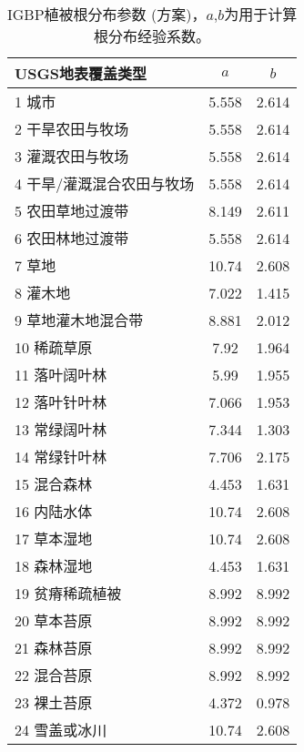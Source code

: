 \begin{table}[]
\centering
\caption{IGBP植被根分布参数 (\citet{zeng2001global}方案)，$a$,$b$为用于计算根分布经验系数。}
\label{tab:IGBP植被根分布参数}
\begin{tabular}{@{}lcc@{}}
\toprule
USGS地表覆盖类型     & $a$ & $b$ \\ \midrule
1 城市           & 5.558      & 2.614      \\
2 干旱农田与牧场      & 5.558      & 2.614      \\
3 灌溉农田与牧场      & 5.558      & 2.614      \\
4 干旱/灌溉混合农田与牧场 & 5.558      & 2.614      \\
5 农田草地过渡带      & 8.149      & 2.611      \\
6 农田林地过渡带      & 5.558      & 2.614      \\
7 草地           & 10.74      & 2.608      \\
8 灌木地          & 7.022      & 1.415      \\
9 草地灌木地混合带     & 8.881      & 2.012      \\
10 稀疏草原        & 7.92       & 1.964      \\
11 落叶阔叶林       & 5.99       & 1.955      \\
12 落叶针叶林       & 7.066      & 1.953      \\
13 常绿阔叶林       & 7.344      & 1.303      \\
14 常绿针叶林       & 7.706      & 2.175      \\
15 混合森林        & 4.453      & 1.631      \\
16 内陆水体        & 10.74      & 2.608      \\
17 草本湿地        & 10.74      & 2.608      \\
18 森林湿地        & 4.453      & 1.631      \\
19 贫瘠稀疏植被      & 8.992      & 8.992      \\
20 草本苔原        & 8.992      & 8.992      \\
21 森林苔原        & 8.992      & 8.992      \\
22 混合苔原        & 8.992      & 8.992      \\
23 裸土苔原        & 4.372      & 0.978      \\
24 雪盖或冰川       & 10.74      & 2.608      \\ \bottomrule
\end{tabular}
\end{table}

